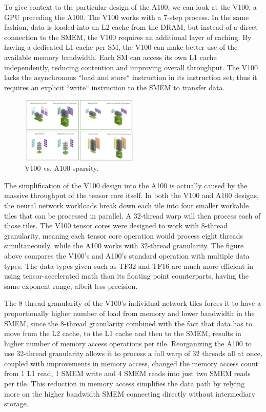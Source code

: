 To give context to the particular design of the A100, we can look at the V100, a GPU preceding the A100.
The V100 works with a 7-step process.
In the same fashion, data is loaded into an L2 cache from the DRAM, but instead of a direct connection to the SMEM, the V100 requires an additional layer of caching.
By having a dedicated L1 cache per SM, the V100 can make better use of the available memory bandwidth.
Each SM can access its own L1 cache independently, reducing contention and improving overall throughput.
The V100 lacks the asynchronous ``load and store`` instruction in its instruction set; thus it requires an explicit ``write`` instruction to the SMEM to transfer data.

\begin{figure}[htbp!]
    \centerline{\includegraphics[width=0.5\textwidth]{images/gpu_sparsity}}
    \caption{V100 vs. A100 sparsity.}
    \label{fig:v100a100spars}
\end{figure}

The simplification of the V100 design into the A100 is actually caused by the massive throughput of the tensor core itself.
In both the V100 and A100 designs, the neural network workloads break down each tile into four smaller workable tiles that can be processed in parallel.
A 32-thread warp will then process each of those tiles.
The V100 tensor cores were designed to work with 8-thread granularity, meaning each tensor core operation would process eight threads simultaneously, while the A100 works with 32-thread granularity.
The figure above compares the V100’s and A100’s standard operation with multiple data types.
The data types given such as TF32 and TF16 are much more efficient in using tensor-accelerated math than its floating point counterparts, having the same exponent range, albeit less precision.

The 8-thread granularity of the V100's individual network tiles forces it to have a proportionally higher number of load from memory and lower bandwidth in the SMEM, since the 8-thread granularity combined with the fact that data has to move from the L2 cache, to the L1 cache and then to the SMEM, results in higher number of memory access operations per tile.
Reorganizing the A100 to use 32-thread granularity allows it to process a full warp of 32 threads all at once, coupled with improvements in memory access, changed the memory access count from 1 L1 read, 1 SMEM write and 4 SMEM reads into just two SMEM reads per tile.
This reduction in memory access simplifies the data path by relying more on the higher bandwidth SMEM connecting directly without intermediary storage.

